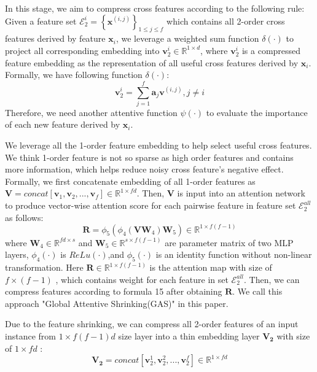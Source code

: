 \documentclass[sigconf,authorversion]{acmart}
\begin{document}
In this stage, we aim to compress cross features according to the following rule: Given a feature set $\mathcal{E}_2^{i} = \left\{  \mathbf{x}^{(i,j)} \right\}_{1 \leqslant j \leqslant f}$ which contains all 2-order cross features derived by feature $ \mathbf{x}_i$, we leverage a weighted sum function $ \delta(\cdot)$ to project all corresponding embedding into $ \mathbf{v}_2^i \in \mathbb{R}^{1 \times d} $, where $ \mathbf{v}_2^i $ is a compressed feature embedding as the representation of all useful cross features derived by $ \mathbf{x}_i$. Formally, we have following function $ \delta(\cdot)$:
 \begin{equation}
         \mathbf{v}_2^i = \sum_{j=1}^{f}\mathbf{a}_j \mathbf{v}^{(i,j)}, j \neq i
 \end{equation}
Therefore, we need another attentive function $ \psi(\cdot)$ to evaluate the importance of each new feature derived by $ \mathbf{x}_i$. 

We leverage all the 1-order feature embedding to help select useful cross features. We think 1-order feature is not so sparse as high order features and contains more information, which helps reduce noisy cross feature's negative effect. Formally, we first concatenate embedding of all 1-order features as $\mathbf{V} = concat[\mathbf{v}_{1},\mathbf{v}_{2},...,\mathbf{v}_{f}]\in \mathbb{R}^{1\times fd}$. Then, $\mathbf{V} $ is input into an attention network to produce vector-wise attention score for each pairwise feature  in feature set $\mathcal{E}_2^{all} $ as follows:
\begin{equation}
         \mathbf{R} = \phi_5\left(\phi_4\left(\mathbf{V}\mathbf{W}_{4}\right )\mathbf{W}_{5}\right)\in \mathbb{R}^{1\times f(f-1)}
 \end{equation}
 where  $\mathbf{W}_4 \in \mathbb{R}^{ fd\times s} $ and $\mathbf{W}_5 \in \mathbb{R}^{ s\times f(f-1) } $ are 
parameter matrix of two MLP layers, $\phi_4\left(\cdot\right) $ is  $ReLu \left(\cdot\right)$,and $\phi_5\left(\cdot\right) $ is an identity function without non-linear transformation. Here  $\mathbf{R}\in \mathbb{R}^{1\times f(f-1)} $ is the attention map with size of $ f \times (f-1) $ , which contains weight for each feature in  set $\mathcal{E}_2^{all} $. Then, we can compress features according to formula 15 after obtaining $\mathbf{R}$. We call this approach "Global Attentive Shrinking(GAS)" in this paper.

Due to the feature shrinking, we can compress all 2-order features of an input instance from $ 1 \times f(f-1)d$ size layer into a thin embedding layer $ \mathbf{V_2}$ with size of $ 1\times fd$ :
\begin{equation}
        \mathbf{V_2} = concat[\mathbf{v}_{2}^1,\mathbf{v}_{2}^2,...,\mathbf{v}_{2}^f]\in \mathbb{R}^{1\times fd}
 \end{equation}
\end{document}
